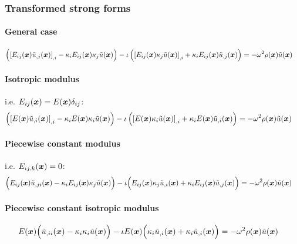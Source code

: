 \subsubsection{Transformed strong forms} \label{sec:it.scalar.strong}

\paragraph{General case}
%
\begin{align}
    \left(
        \left[ E_{ij}(\boldsymbol{x}) \tilde{u}_{,j}(\boldsymbol{x}) \right]_{,i}
        - \kappa_{i} E_{ij}(\boldsymbol{x}) \kappa_{j} \tilde{u}(\boldsymbol{x})
    \right) - \iota \left(
        \left[
            E_{ij}(\boldsymbol{x}) \kappa_{j} \tilde{u}(\boldsymbol{x})
        \right]_{,i}
        + \kappa_{i} E_{ij}(\boldsymbol{x}) \tilde{u}_{,j}(\boldsymbol{x})
    \right) &=
    -\omega^2 \rho(\boldsymbol{x}) \tilde{u}(\boldsymbol{x}) \label{eq:it.scalar.strong.general}
\end{align}

\paragraph{Isotropic modulus} i.e. \(E_{ij}(\boldsymbol{x}) = E(\boldsymbol{x}) \delta_{ij}\):
%
\begin{align}
    \left(
        \left[ E(\boldsymbol{x}) \tilde{u}_{,i}(\boldsymbol{x}) \right]_{,i}
        - \kappa_{i} E(\boldsymbol{x}) \kappa_{i} \tilde{u}(\boldsymbol{x})
    \right) - \iota \left(
        \left[
            E(\boldsymbol{x}) \kappa_{i} \tilde{u}(\boldsymbol{x})
        \right]_{,i}
        + \kappa_{i} E(\boldsymbol{x}) \tilde{u}_{,i}(\boldsymbol{x})
    \right) &=
    -\omega^2 \rho(\boldsymbol{x}) \tilde{u}(\boldsymbol{x}) \label{eq:it.scalar.strong.iso}
\end{align}

\paragraph{Piecewise constant modulus} i.e. \(E_{ij,k}(\boldsymbol{x}) = 0\):
%
\begin{align}
    \Bigl(
        E_{ij}(\boldsymbol{x}) \tilde{u}_{,ji}(\boldsymbol{x})
        - \kappa_{i} E_{ij}(\boldsymbol{x}) \kappa_{j} \tilde{u}(\boldsymbol{x})
    \Bigr) - \iota \Bigl(
        E_{ij}(\boldsymbol{x}) \kappa_{j} \tilde{u}_{,i}(\boldsymbol{x})
        + \kappa_{i} E_{ij}(\boldsymbol{x}) \tilde{u}_{,j}(\boldsymbol{x})
    \Bigr) &=
    -\omega^2 \rho(\boldsymbol{x}) \tilde{u}(\boldsymbol{x}) \label{eq:it.scalar.strong.pc}
\end{align}

\paragraph{Piecewise constant isotropic modulus}
%
\begin{align}
    E(\boldsymbol{x}) \Bigl(
        \tilde{u}_{,ii}(\boldsymbol{x})
        - \kappa_{i} \kappa_{i} \tilde{u}(\boldsymbol{x})
    \Bigr) - \iota E(\boldsymbol{x}) \Bigl(
        \kappa_{i} \tilde{u}_{,i}(\boldsymbol{x}) + \kappa_{i} \tilde{u}_{,i}(\boldsymbol{x})
    \Bigr) &=
    -\omega^2 \rho(\boldsymbol{x}) \tilde{u}(\boldsymbol{x}) \label{eq:it.scalar.strong.pc-iso}
\end{align}


